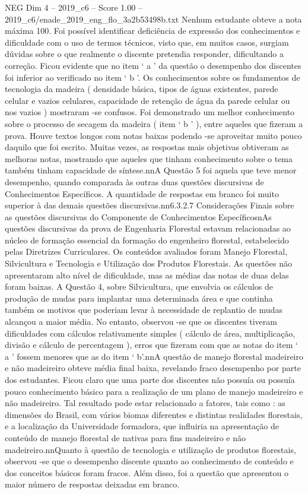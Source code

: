 \begin{textsample}{NEG Dim 4 – 2019\_c6 – Score 1.00 – 2019\_c6/enade\_2019\_eng\_flo\_3a2b53498b.txt}
Nenhum estudante obteve a nota máxima 100.
Foi possível identificar deficiência de expressão dos conhecimentos e dificuldade com o uso de termos técnicos, visto que, em muitos casos, surgiam dúvidas sobre o que realmente o discente pretendia responder, dificultando a correção.
Ficou evidente que no item ‘ a ’ da questão o desempenho dos discentes foi inferior ao verificado no item ‘ b ’.
Os conhecimentos sobre os fundamentos de tecnologia da madeira ( densidade básica, tipos de águas existentes, parede celular e vazios celulares, capacidade de retenção de água da parede celular ou nos vazios ) mostraram -se confusos.
Foi demonstrado um melhor conhecimento sobre o processo de secagem da madeira ( item ‘ b ’ ), entre aqueles que fizeram a prova.
Houve textos longos com notas baixas podendo -se aproveitar muito pouco daquilo que foi escrito.
Muitas vezes, as respostas mais objetivas obtiveram as melhoras notas, mostrando que aqueles que tinham conhecimento sobre o tema também tinham capacidade de síntese.nnA Questão 5 foi aquela que teve menor desempenho, quando comparada às outras duas questões discursivas de Conhecimentos Específicos.
A quantidade de respostas em branco foi muito superior à das demais questões discursivas.nn6.3.2.7 Considerações Finais sobre as questões discursivas do Componente de Conhecimentos EspecíficosnAs questões discursivas da prova de Engenharia Florestal estavam relacionadas ao núcleo de formação essencial da formação do engenheiro florestal, estabelecido pelas Diretrizes Curriculares.
Os conteúdos avaliados foram Manejo Florestal, Silvicultura e Tecnologia e Utilização dos Produtos Florestais.
As questões não apresentaram alto nível de dificuldade, mas as médias das notas de duas delas foram baixas.
A Questão 4, sobre Silvicultura, que envolvia os cálculos de produção de mudas para implantar uma determinada área e que continha também os motivos que poderiam levar à necessidade de replantio de mudas alcançou a maior média.
No entanto, observou -se que os discentes tiveram dificuldades com cálculos relativamente simples ( cálculo de área, multiplicação, divisão e cálculo de percentagem ), erros que fizeram com que as notas do item ‘ a ’ fossem menores que as do item ‘ b’.nnA questão de manejo florestal madeireiro e não madeireiro obteve média final baixa, revelando fraco desempenho por parte dos estudantes.
Ficou claro que uma parte dos discentes não possuía ou possuía pouco conhecimento básico para a realização de um plano de manejo madeireiro e não madeireiro.
Tal resultado pode estar relacionado a fatores, tais como : as dimensões do Brasil, com vários biomas diferentes e distintas realidades florestais, e a localização da Universidade formadora, que influiria na apresentação de conteúdo de manejo florestal de nativas para fins madeireiro e não madeireiro.nnQuanto à questão de tecnologia e utilização de produtos florestais, observou -se que o desempenho discente quanto ao conhecimento de conteúdo e dos conceitos básicos foram fracos.
Além disso, foi a questão que apresentou o maior número de respostas deixadas em branco.

\end{textsample}
